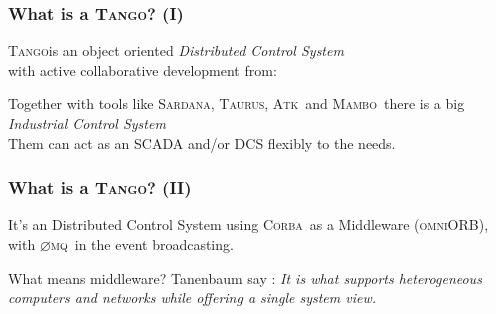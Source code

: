 \documentclass{beamer}
\newcommand{\tango}{\textsc{Tango}}
\newcommand{\corba}{\textsc{Corba}}
\newcommand{\onmiORB}{\textsc{omniORB}}
\newcommand{\zmq}{\textsc{$\varnothing$mq}}
\newcommand{\sardana}{\textsc{Sardana}}
\newcommand{\mambo}{\textsc{Mambo}}
\newcommand{\atk}{\textsc{Atk}}
\newcommand{\taurus}{\textsc{Taurus}}
\begin{document}
\begin{frame}
\frametitle{What is a \tango? (I)}
    \tango is an object oriented \emph{Distributed Control System}\\with active collaborative development from:
    \begin{figure}[h]
    \end{figure}
    Together with tools like \sardana, \taurus, \atk\, and \mambo\, there is a big \emph{Industrial Control System}\\
    Them can act as an SCADA and/or DCS flexibly to the needs.
\end{frame}

\begin{frame}
\frametitle{What is a \tango? (II)}
    \begin{block}{It's an Distributed Control System}
        using \corba\, as a Middleware (\onmiORB),\\ with \zmq\, in the event broadcasting.
    \end{block}
    \begin{block}{What means middleware?}
        Tanenbaum say \cite{TanenbaumDistr}: \emph{It is what supports heterogeneous computers and networks while offering a single system view.}
    \end{block}
\end{frame}
\end{document}
